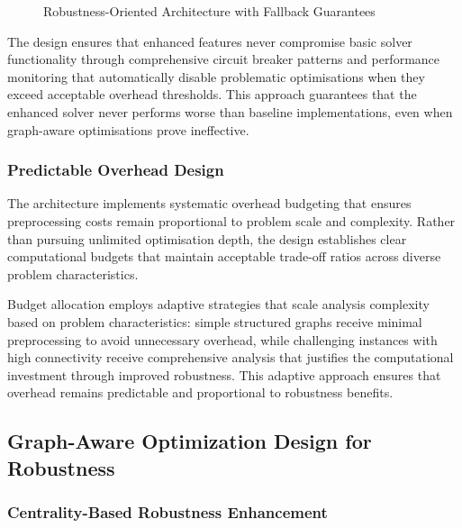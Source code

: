 \begin{figure}[htbp]
\caption{Robustness-Oriented Architecture with Fallback Guarantees}
\label{fig:robust_architecture}
\end{figure}

The design ensures that enhanced features never compromise basic solver functionality through comprehensive circuit breaker patterns and performance monitoring that automatically disable problematic optimisations when they exceed acceptable overhead thresholds. This approach guarantees that the enhanced solver never performs worse than baseline implementations, even when graph-aware optimisations prove ineffective.

\subsubsection{Predictable Overhead Design}

The architecture implements systematic overhead budgeting that ensures preprocessing costs remain proportional to problem scale and complexity. Rather than pursuing unlimited optimisation depth, the design establishes clear computational budgets that maintain acceptable trade-off ratios across diverse problem characteristics.

Budget allocation employs adaptive strategies that scale analysis complexity based on problem characteristics: simple structured graphs receive minimal preprocessing to avoid unnecessary overhead, while challenging instances with high connectivity receive comprehensive analysis that justifies the computational investment through improved robustness. This adaptive approach ensures that overhead remains predictable and proportional to robustness benefits.

\subsection{Graph-Aware Optimization Design for Robustness}

\subsubsection{Centrality-Based Robustness Enhancement}

